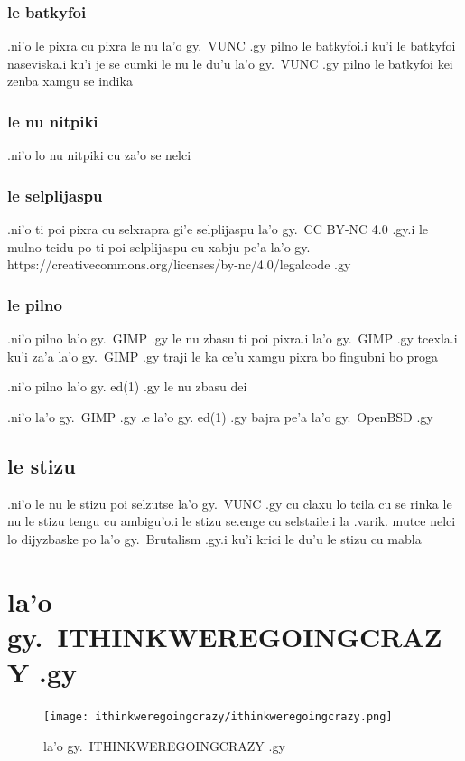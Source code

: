 \documentclass{report}
\begin{document}
\subsection{le batkyfoi}
.ni'o le pixra cu pixra le nu la'o gy.\ VUNC .gy pilno le batkyfoi\@  .i ku'i le batkyfoi naseviska\@  .i ku'i je se cumki le nu le du'u la'o gy.\ VUNC .gy pilno le batkyfoi kei zenba xamgu se indika

\subsection{le nu nitpiki}
.ni'o lo nu nitpiki cu za'o se nelci

\subsection{le selplijaspu}
.ni'o ti poi pixra cu selxrapra gi'e selplijaspu la'o gy.\ CC BY-NC 4.0 .gy\@ .i le mulno tcidu po ti poi selplijaspu cu xabju pe'a la'o gy. https://creativecommons.org/licenses/by-nc/4.0/legalcode .gy

\subsection{le pilno}
.ni'o pilno la'o gy.\ GIMP .gy le nu zbasu ti poi pixra\@  .i la'o gy.\ GIMP .gy tcexla\@  .i ku'i za'a la'o gy.\ GIMP .gy traji le ka ce'u xamgu pixra bo fingubni bo proga

.ni'o pilno la'o gy. ed(1) .gy le nu zbasu dei

.ni'o la'o gy.\ GIMP .gy .e la'o gy. ed(1) .gy bajra pe'a la'o gy.\ OpenBSD .gy

\section{le stizu}
.ni'o le nu le stizu poi selzutse la'o gy.\ VUNC .gy cu claxu lo tcila cu se rinka le nu le stizu tengu cu ambigu'o\@  .i le stizu se.enge cu selstaile\@  .i la .varik. mutce nelci lo dijyzbaske po la'o gy.\ Brutalism .gy\@  .i ku'i krici le du'u le stizu cu mabla

\chapter{la'o gy.\ ITHINKWEREGOINGCRAZY .gy}
\begin{figure}[ht]
	\centering
	\texttt{[image: ithinkweregoingcrazy/ithinkweregoingcrazy.png]}
	\caption[center]{la'o gy.\ ITHINKWEREGOINGCRAZY .gy}
\end{figure}
\end{document}
